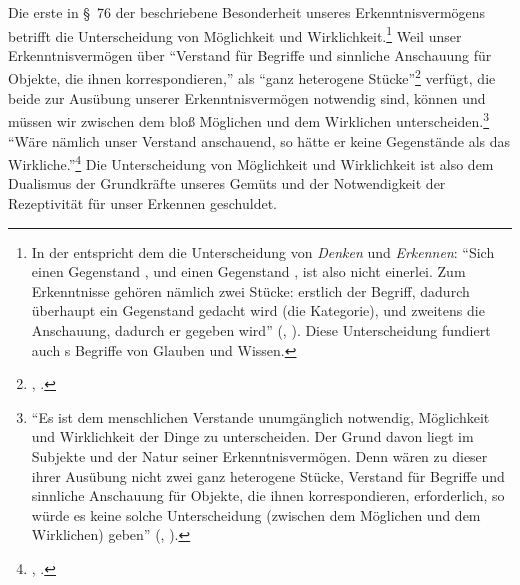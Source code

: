 Die erste in \S~76 der  beschriebene Besonderheit
unseres Erkenntnisvermögens betrifft die Unterscheidung von Möglichkeit und
Wirklichkeit.\footnote{In der  entspricht dem die
Unterscheidung von \emph{Denken} und \emph{Erkennen}:
\enquote{Sich einen Gegenstand , und einen Gegenstand , ist
also nicht einerlei. Zum Erkenntnisse gehören nämlich zwei Stücke: erstlich der
Begriff, dadurch überhaupt ein Gegenstand gedacht wird (die Kategorie), und
zweitens die Anschauung, dadurch er gegeben
wird} \mkbibparens{\cite[][\S~22]{Kant:KritikderreinenVernunft2003},
\cite[][III: 116.34--117.2]{Kant:GesammelteWerke1900ff.}}.
Diese Unterscheidung fundiert auch s Begriffe von Glauben
und Wissen.} Weil unser Erkenntnisvermögen über \enquote{Verstand für
Begriffe und sinnliche Anschauung für Objekte, die ihnen korrespondieren,} als
\enquote{ganz heterogene
Stücke}\footnote{\cite[][\S~76]{Kant:KritikderUrteilskraft2009}, \cite[][V:
401.34--36]{Kant:GesammelteWerke1900ff.}.} verfügt, die beide zur Ausübung
unserer Erkenntnisvermögen notwendig sind, können und müssen wir zwischen dem
bloß Möglichen und dem Wirklichen unterscheiden.\footnote{\enquote{Es
    ist dem menschlichen Verstande unumgänglich notwendig, Möglichkeit
    und Wirklichkeit der Dinge zu unterscheiden. Der Grund davon liegt
    im Subjekte und der Natur seiner Erkenntnisvermögen. Denn wären zu
    dieser ihrer Ausübung nicht zwei ganz heterogene Stücke, Verstand
    für Begriffe und sinnliche Anschauung für Objekte, die ihnen
    korrespondieren, erforderlich, so würde es keine solche
    Unterscheidung (zwischen dem Möglichen und dem Wirklichen) geben}
  \mkbibparens{\cite[][\S~76]{Kant:KritikderUrteilskraft2009},
    \cite[][V: 401.31--402.1]{Kant:GesammelteWerke1900ff.}}.}
\enquote{Wäre nämlich unser Verstand anschauend, so hätte er keine Gegenstände als das
Wirkliche.}\footnote{\cite[][\S~76]{Kant:KritikderUrteilskraft2009}, \cite[][V:
402.1--2]{Kant:GesammelteWerke1900ff.}.} Die Unterscheidung von
Möglichkeit und Wirklichkeit ist also dem Dualismus der
Grundkräfte unseres Gemüts und der Notwendigkeit der Rezeptivität für unser
Erkennen geschuldet.

